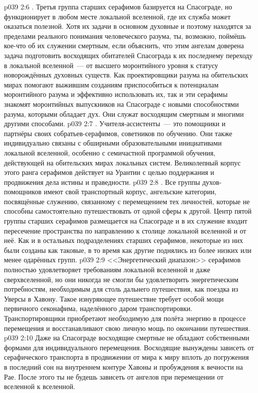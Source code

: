 \vs p039 2:6 . Третья группа старших серафимов базируется на Спасограде, но функционирует в любом месте локальной вселенной, где их служба может оказаться полезной. Хотя их задачи в основном духовные и поэтому находятся за пределами реального понимания человеческого разума, ты, возможно, поймёшь кое-что об их служении смертным, если объяснить, что этим ангелам доверена задача подготовить восходящих обитателей Спасограда к их последнему переходу в локальной вселенной~--- от высшего моронтийного уровня к статусу новорождённых духовных существ. Как проектировщики разума на обительских мирах помогают выжившим созданиям приспособиться к потенциалам моронтийного разума и эффективно использовать их, так и эти серафимы знакомят моронтийных выпускников на Спасограде с новыми способностями разума, которыми обладает дух. Они служат восходящим смертным и многими другими способами.
\vs p039 2:7 . Учителя\hyp{}ассистенты~--- это помощники и партнёры своих собратьев\hyp{}серафимов, советников по обучению. Они также индивидуально связаны с обширными образовательными инициативами локальной вселенной, особенно с семичастной программой обучения, действующей на обительских мирах локальных систем. Великолепный корпус этого ранга серафимов действует на Урантии с целью поддержания и продвижения дела истины и праведности.
\vs p039 2:8 . Все группы духов\hyp{}помощников имеют свой транспортный корпус, ангельские категории, посвящённые служению, связанному с перемещением тех личностей, которые не способны самостоятельно путешествовать от одной сферы к другой. Центр пятой группы старших серафимов размещается на Спасограде и в их служение входит пересечение пространства по направлению к столице локальной вселенной и от неё. Как и в остальных подразделениях старших серафимов, некоторые из них были созданы как таковые, в то время как другие поднялись из более низких или менее одарённых групп.
\vs p039 2:9 \pc <<Энергетический диапазон>> серафимов полностью удовлетворяет требованиям локальной вселенной и даже сверхвселенной, но они никогда не смогли бы удовлетворить энергетическим потребностям, необходимым для столь дальнего путешествия, как поездка из Уверсы в Хавону. Такое изнуряющее путешествие требует особой мощи первичного секонафима, наделённого даром транспортировки. Транспортировщики приобретают необходимую для полёта энергию в процессе перемещения и восстанавливают свою личную мощь по окончании путешествия.
\vs p039 2:10 \pc Даже на Спасограде восходящие смертные не обладают собственными формами для индивидуального перемещения. Восходящие вынуждены зависеть от серафического транспорта в продвижении от мира к миру вплоть до погружения в последний сон на внутреннем контуре Хавоны и пробуждения к вечности на Рае. После этого ты не будешь зависеть от ангелов при перемещении от вселенной к вселенной.
